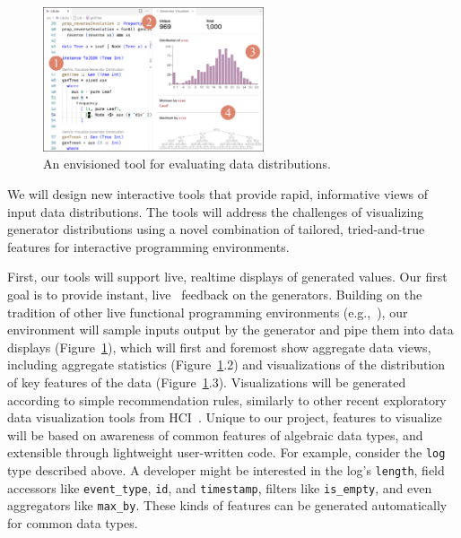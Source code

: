 \begin{figure}
  \centering
  \includegraphics[width=0.58\textwidth]{assets/gen-vis.pdf}
  \caption{An envisioned tool for evaluating data distributions.}\label{fig:gen-vis}
\end{figure}

We will design new interactive tools that provide rapid,
informative views of input data distributions. The tools will address the
challenges of visualizing generator distributions using a novel combination of
tailored, tried-and-true features for interactive programming environments.

First, our tools will support live, realtime displays of generated values.
Our first goal is to provide
instant, live~\cite{ref:tanimoto1990viva} feedback on the generators. Building
on the tradition of other live functional programming environments
(e.g.,~\cite{tool:lighttable,ref:omar2019live}),
our environment will sample inputs
output by the generator and
pipe them into data displays (Figure~\ref{fig:gen-vis}), which
will first and foremost show aggregate data views, including aggregate
statistics (Figure~\ref{fig:gen-vis}.2) and visualizations of the distribution
of key features of the data (Figure~\ref{fig:gen-vis}.3). Visualizations will be
generated according to simple recommendation rules, similarly to other recent
exploratory data visualization tools from
HCI~\cite{ref:lee2021lux,wongsuphasawat_voyager_2016,
wongsuphasawat_voyager_2017}. Unique to our project, features to visualize will
be based on awareness of common features of algebraic data types, and extensible
through lightweight user-written code. For example, consider the
\lstinline{log} type
described above. A developer might be interested in the log's
\lstinline{length}, field accessors like \lstinline{event_type}, \lstinline{id},
and \lstinline{timestamp}, filters like \lstinline{is_empty}, and even
aggregators like \lstinline{max_by}. These kinds of features can be
generated automatically for common data types.

